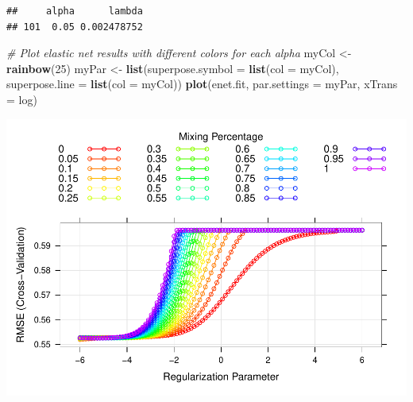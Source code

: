 \documentclass[
]{article}
\newenvironment{Shaded}{\begin{snugshade}}{\end{snugshade}}
\newcommand{\AttributeTok}[1]{\textcolor[rgb]{0.13,0.29,0.53}{#1}}
\newcommand{\CommentTok}[1]{\textcolor[rgb]{0.56,0.35,0.01}{\textit{#1}}}
\newcommand{\DecValTok}[1]{\textcolor[rgb]{0.00,0.00,0.81}{#1}}
\newcommand{\FunctionTok}[1]{\textcolor[rgb]{0.13,0.29,0.53}{\textbf{#1}}}
\newcommand{\NormalTok}[1]{#1}
\newcommand{\OtherTok}[1]{\textcolor[rgb]{0.56,0.35,0.01}{#1}}
\newcommand{\SpecialCharTok}[1]{\textcolor[rgb]{0.81,0.36,0.00}{\textbf{#1}}}
\begin{document}
\begin{verbatim}
##     alpha      lambda
## 101  0.05 0.002478752
\end{verbatim}

\begin{Shaded}
\begin{Highlighting}[]
\CommentTok{\# Plot elastic net results with different colors for each alpha}
\NormalTok{myCol }\OtherTok{\textless{}{-}} \FunctionTok{rainbow}\NormalTok{(}\DecValTok{25}\NormalTok{)}
\NormalTok{myPar }\OtherTok{\textless{}{-}} \FunctionTok{list}\NormalTok{(}\AttributeTok{superpose.symbol =} \FunctionTok{list}\NormalTok{(}\AttributeTok{col =}\NormalTok{ myCol),}
              \AttributeTok{superpose.line =} \FunctionTok{list}\NormalTok{(}\AttributeTok{col =}\NormalTok{ myCol))}
\FunctionTok{plot}\NormalTok{(enet.fit, }\AttributeTok{par.settings =}\NormalTok{ myPar, }\AttributeTok{xTrans =}\NormalTok{ log)}
\end{Highlighting}
\end{Shaded}

\includegraphics{p8106_midterm_project_files/figure-latex/unnamed-chunk-19-1.pdf}

\begin{Shaded}
\end{Shaded}
\end{document}
